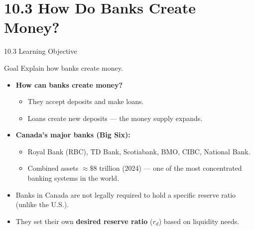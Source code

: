 \documentclass[aspectratio=169]{beamer}
\begin{document}
\section{10.3 How Do Banks Create Money?}

\begin{frame}{10.3 Learning Objective}
\transfade
\begin{block}{Goal}
Explain how banks create money.
\end{block}
\begin{itemize}
  \item \textbf{How can banks create money?}
  \begin{itemize}
    \item They accept deposits and make loans.
    \item Loans create new deposits --- the money supply \alert{expands}.
  \end{itemize}
  \item \textbf{Canada's major banks (Big Six):}
  \begin{itemize}
    \item Royal Bank (RBC), TD Bank, Scotiabank, BMO, CIBC, National Bank.
    \item Combined assets $\approx \$8$ trillion (2024) --- one of the most concentrated banking systems in the world.
  \end{itemize}
  \item Banks in Canada are not legally required to hold a specific reserve ratio (unlike the U.S.).
  \item They set their own \textbf{desired reserve ratio} ($r_d$) based on liquidity needs.
\end{itemize}
\end{frame}
\end{document}

